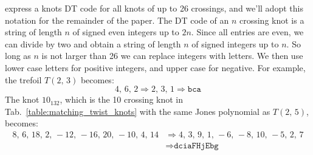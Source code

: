 \documentclass{article}
\theoremstyle{plain}
\begin{document}
        express a knots DT code for all knots of up to 26 crossings, and we'll
        adopt this notation for the remainder of the paper. The DT code of an
        $n$ crossing knot is a string of length $n$ of signed even integers up
        to $2n$. Since all entries are even, we can divide by two and obtain
        a string of length $n$ of signed integers up to $n$. So long as $n$ is
        not larger than 26 we can replace integers with letters. We then use
        lower case letters for positive integers, and upper case for negative.
        For example, the trefoil $T(2,\,3)$ becomes:
        \begin{equation}
            4,\,6,\,2
            \Rightarrow
            2,\,3,\,1
            \Rightarrow
            \texttt{bca}
        \end{equation}
        The knot $10_{132}$, which is the 10 crossing knot in
        Tab.~\ref{table:matching_twist_knots} with the same Jones polynomial
        as $T(2,\,5)$, becomes:
        \begin{align}
            8,\,6,\,18,\,2,\,-12,\,-16,\,20,\,-10,\,4,\,14
            &\Rightarrow
            4,\,3,\,9,\,1,\,-6,\,-8,\,10,\,-5,\,2,\,7\\
            &\Rightarrow
            \texttt{dciaFHjEbg}
        \end{align}
\end{document}
